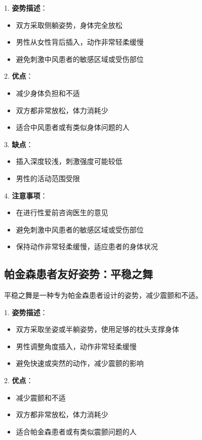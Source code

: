 \documentclass[12pt,UTF8]{ctexbook}
\begin{document}
1. \textbf{姿势描述}：
  \begin{itemize}
  \item 双方采取侧躺姿势，身体完全放松
  \item 男性从女性背后插入，动作非常轻柔缓慢
  \item 避免刺激中风患者的敏感区域或受伤部位
  \end{itemize}

2. \textbf{优点}：
  \begin{itemize}
  \item 减少身体负担和不适
  \item 双方都非常放松，体力消耗少
  \item 适合中风患者或有类似身体问题的人
  \end{itemize}

3. \textbf{缺点}：
  \begin{itemize}
  \item 插入深度较浅，刺激强度可能较低
  \item 男性的活动范围受限
  \end{itemize}

4. \textbf{注意事项}：
  \begin{itemize}
  \item 在进行性爱前咨询医生的意见
  \item 避免刺激中风患者的敏感区域或受伤部位
  \item 保持动作非常轻柔缓慢，适应患者的身体状况
  \end{itemize}

\subsection{帕金森患者友好姿势：平稳之舞}

平稳之舞是一种专为帕金森患者设计的姿势，减少震颤和不适。

1. \textbf{姿势描述}：
  \begin{itemize}
  \item 双方采取坐姿或半躺姿势，使用足够的枕头支撑身体
  \item 男性调整角度插入，动作非常轻柔缓慢
  \item 避免快速或突然的动作，减少震颤的影响
  \end{itemize}

2. \textbf{优点}：
  \begin{itemize}
  \item 减少震颤和不适
  \item 双方都非常放松，体力消耗少
  \item 适合帕金森患者或有类似震颤问题的人
  \end{itemize}
\end{document}
